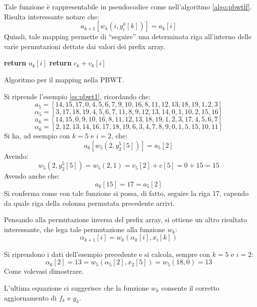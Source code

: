 Tale funzione è rappresentabile in pseudocodice come nell'algoritmo
\ref{algo:pbwtlf}. \\
Risulta interessante notare che:
\begin{equation}
  \label{eq:pbwt3}
  a_{k+1}\left[w_k\left(i,y_i^k[k]\right)\right]=a_k[i]
\end{equation}
Quindi, tale mapping permette di ``seguire'' una determinata riga
all'interno delle varie permutazioni dettate dai valori dei prefix array.
\begin{algorithm}
  \small
  \begin{algorithmic}[1]
    \State \textbf{return} $u_k[i]$
    \Else
    \State \textbf{return} $c_k+v_k[i]$
    \EndIf
    \EndFunction
  \end{algorithmic}
  \caption{Algoritmo per il mapping nella PBWT.}
  \label{algo:pbwtlf}
\end{algorithm}
\begin{esempio}
  Si riprende l'esempio
  \ref{es:pbwt1}, ricordando che:
  \[a_5=[14,15,17,0,4,5,6,7,9,10,16,8,11,12,13,18,19,1,2,3]\]
  \[\alpha_5=[3,17,18,19,4,5,6,7,11,8,9,12,13,14,0,1,10,2,15,16]\]
  \[a_6=[14,15,0,9,10,16,8,11,12,13,18,19,1,2,3,17,4,5,6,7]\]
  \[\alpha_6=[2,12,13,14,16,17,18,19,6,3,4,7,8,9,0,1,5,15,10,11]\]
  Si ha, ad esempio con $k=5$ e $i=2$, che:
  \[a_{6}\left[w_5\left(2,y_2^5[5]\right)\right]=a_5[2]\]
  Avendo:
  \[w_5\left(2,y_2^5[5]\right)=w_5\left(2,1\right)=v_5[2]+c[5]=0+15=15\]
  Avendo anche che:
  \[a_{6}[15]=17=a_5[2]\]
  Si conferma come con tale funzione si possa, di fatto, seguire la riga 17,
  capendo da quale riga della colonna permutata precedente arrivi.
\end{esempio}
\noindent
Pensando alla permutazione inversa del prefix array, si
ottiene un altro risultato interessante, che lega tale permutazione alla
funzione $w_k$:
\begin{equation}
  \label{eq:pbwtw4}
  \alpha_{k+1}[i]=w_k(\alpha_k[i],x_i[k])
\end{equation}
\begin{esempio}
  Si riprendono i dati dell'esempio precedente e si calcola, sempre con
  $k=5$ e $i=2$:
  \[\alpha_{6}[2]=13=w_5(\alpha_5[2],x_2[5])=w_5(18,0)=13\]
  Come volevasi dimostrare.
\end{esempio}
L'ultima equazione ci suggerisce che la funzione $w_k$
consente il corretto aggiornamento di $f_k$ e $g_k$.
